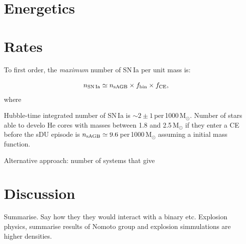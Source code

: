 \documentclass[twocolumn,tighten,times]{aastex62}
\begin{document}
\section{Energetics}

\section{Rates}
To first order, the \emph{maximum} number of SN\,Ia per unit mass is:

\begin{equation}
n_{\rm SN\,Ia} \simeq n_{\rm sAGB}\times f_{\rm bin} \times f_{\rm CE},
\end{equation}
where 


Hubble-time integrated number of SN\,Ia is $\sim 2\pm 1$\,per\,1000\,M$_{\odot}$. 
Number of stars able to develo He cores with masses between 
1.8 and 2.5\,M$_{\odot}$ if they enter a CE before the sDU episode is 
$n_{\rm sAGB}\simeq 9.6$\,per\,1000\,M$_{\odot}$ 
assuming a \cite{habrier:2004vw} initial mass function. 


Alternative approach: number of systems that give 
\section{Discussion}

Summarise. Say how they they would interact with a binary etc. Explosion physics, 
summarise results of Nomoto group and explosion simmulations are higher densities. 









\end{document}
